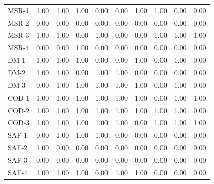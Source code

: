 \begin{table}[h]
\begin{tabular}{lccccccccc}
MSR-1 & 1.00 & 1.00 & 1.00 & 0.00 & 0.00 & 1.00 & 1.00 & 0.00 & 0.00 \\
MSR-2 & 0.00 & 0.00 & 0.00 & 0.00 & 0.00 & 0.00 & 0.00 & 0.00 & 0.00 \\
MSR-3 & 1.00 & 1.00 & 0.00 & 1.00 & 0.00 & 0.00 & 1.00 & 1.00 & 1.00 \\
MSR-4 & 0.00 & 0.00 & 1.00 & 0.00 & 0.00 & 0.00 & 0.00 & 0.00 & 0.00 \\
DM-1 & 1.00 & 1.00 & 1.00 & 0.00 & 0.00 & 1.00 & 0.00 & 1.00 & 0.00 \\
DM-2 & 1.00 & 1.00 & 0.00 & 1.00 & 1.00 & 0.00 & 0.00 & 0.00 & 0.00 \\
DM-3 & 0.00 & 1.00 & 1.00 & 1.00 & 1.00 & 1.00 & 0.00 & 1.00 & 0.00 \\
COD-1 & 1.00 & 1.00 & 1.00 & 1.00 & 1.00 & 1.00 & 0.00 & 1.00 & 1.00 \\
COD-2 & 1.00 & 1.00 & 1.00 & 1.00 & 1.00 & 1.00 & 1.00 & 1.00 & 0.00 \\
COD-3 & 1.00 & 1.00 & 1.00 & 1.00 & 1.00 & 0.00 & 1.00 & 1.00 & 1.00 \\
SAF-1 & 0.00 & 1.00 & 1.00 & 1.00 & 0.00 & 0.00 & 0.00 & 0.00 & 0.00 \\
SAF-2 & 1.00 & 0.00 & 0.00 & 0.00 & 0.00 & 0.00 & 0.00 & 0.00 & 0.00 \\
SAF-3 & 0.00 & 0.00 & 0.00 & 0.00 & 0.00 & 0.00 & 0.00 & 0.00 & 0.00 \\
SAF-4 & 1.00 & 1.00 & 1.00 & 0.00 & 1.00 & 1.00 & 0.00 & 0.00 & 0.00 \\
\bottomrule
\end{tabular}
\end{table}